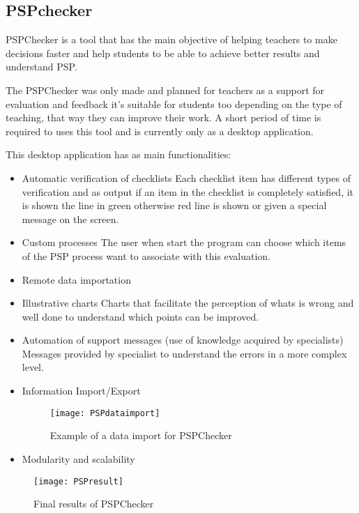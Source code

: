 \subsection{PSPchecker}

PSPChecker\citep{Pinto2010} is a tool that has the main objective of helping teachers to make decisions faster and help students to be able to achieve better results and understand PSP.

The PSPChecker was only made and planned for teachers as a support for evaluation and feedback it's suitable for students too depending on the type of teaching, that way they can improve their work. A short period of time is required to uses this tool and is currently only as a desktop application.


This desktop application has as main functionalities:
\begin{itemize}
	\item Automatic verification of checklists
	\subitem Each checklist item has different types of verification and as output if an item in the checklist is completely satisfied, it is shown the line in green otherwise red line is shown or given a special message on the screen.
	\item Custom processes
	\subitem The user when start the program can choose which items of the PSP process want to associate with this evaluation.
	\item Remote data importation
	\item Illustrative charts
	\subitem Charts that facilitate the perception of whats is wrong and well done to understand which points can be improved.
	\item Automation of support messages (use of knowledge acquired by specialists)
	\subitem Messages provided by specialist to understand the errors in a more complex level.
	\item Information Import/Export
	\begin{figure}[h]
		\begin{center}
			\leavevmode
			\texttt{[image: PSPdataimport]}
			\caption{Example of a data import for PSPChecker}
			\label{fig:PSPdataimport}
		\end{center}
	\end{figure}
	\item Modularity and scalability
\end{itemize}

\begin{figure}[h]
	\begin{center}
		\leavevmode
		\texttt{[image: PSPresult]}
		\caption{Final results of PSPChecker}
		\label{fig:PSPdataimport}
	\end{center}
\end{figure}

